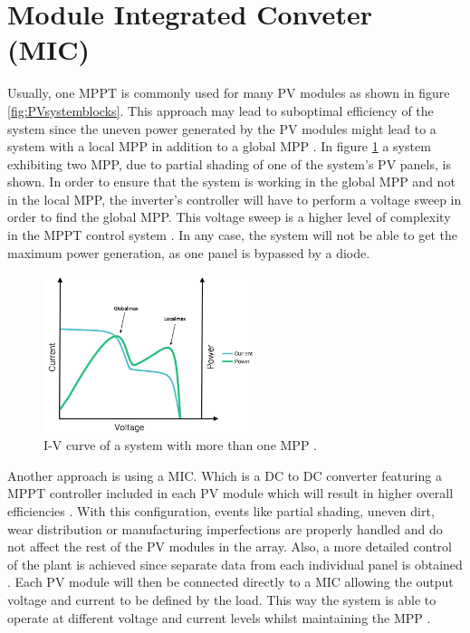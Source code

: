 
\section{Module Integrated Conveter (MIC)}

Usually, one MPPT is commonly used for many PV modules as shown in figure \ref{fig:PVsystemblocks}. This approach may lead to suboptimal efficiency of the system since the uneven power generated by the PV modules might lead to a system with a local MPP in addition to a global MPP \cite{AN1521_MC}. In figure \ref{multiple_local_MPP} a system exhibiting two MPP, due to partial shading of one of the system's PV panels, is shown. In order to ensure that the system is working in the global MPP and not in the local MPP, the inverter's controller will have to perform a voltage sweep in order to find the global MPP. This voltage sweep is a higher level of complexity in the MPPT control system \cite{AN1521_MC}. In any case, the system will not be able to get the maximum power generation, as one panel is bypassed by a diode.
\begin{figure}[H]
	\begin{center}
		\includegraphics[width=0.55\textwidth]{../Pictures/local_MPP}
		\caption{I-V curve of a system with more than one MPP \cite{local_mpp}.}
		\label{multiple_local_MPP}
	\end{center}	
\end{figure} 

Another approach is using a MIC. Which is a DC to DC converter featuring a MPPT controller included in each PV module which will result in higher overall efficiencies \cite{ArchitectureMIC}. With this configuration, events like partial shading, uneven dirt, wear distribution or manufacturing imperfections are properly handled and do not affect the rest of the PV modules in the array. Also, a more detailed control of the plant is achieved since separate data from each individual panel is obtained \cite{ArchitectureMIC}. Each PV module will then be connected directly to a MIC allowing the output voltage and current to be defined by the load. This way the system is able to operate at different voltage and current levels whilst maintaining the MPP \cite{ArchitectureMIC}.

